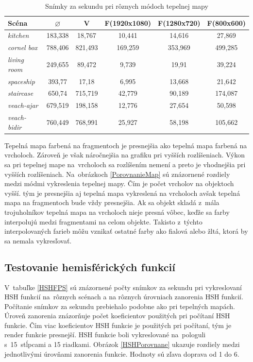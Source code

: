 \begin{table}[t!] \label{HMFPS}
\centering
\begin{tabular}{|l|c|c|c|c|c|}
\hline
\textbf{Scéna} & $\varnothing$ & \textbf{V} & \textbf{F(1920x1080)} & \textbf{F(1280x720)} & \textbf{F(800x600)}   \\ \hline
\textit{kitchen} & 183,338 & 18,767 & 10,441 & 14,616 & 27,869 \\ \hline
\textit{cornel box} & 788,406 & 821,493 & 169,259 & 353,969 & 499,285 \\ \hline
\textit{living room} & 249,655 & 89,472 & 9,739 & 19,91 & 39,224 \\ \hline
\textit{spaceship} & 393,77 & 17,18 & 6,995 & 13,668 & 21,642 \\ \hline
\textit{staircase} & 650,74 & 715,719 & 42,779 & 90,189 & 174,087 \\ \hline
\textit{veach-ajar} & 679,519 & 198,158 & 12,776 & 27,654 & 50,598 \\ \hline
\textit{veach-bidir} & 760,449 & 768,991 & 25,927 & 58,198 & 105,662 \\ \hline
\end{tabular}
\caption{Snímky za sekundu pri rôznych módoch tepelnej mapy}
\end{table}

\noindent Tepelná mapa farbená na fragmentoch je presnejšia ako tepelná mapa farbená na vrcholoch. Zároveň je však náročnejšia na grafiku pri vyšších rozlíšeniach. Výkon sa pri tepelnej mape na~vrcholoch sa rozlíšením nemení a preto je vhodnejšia pri vyšších rozlíšeniach. Na~obrázkoch \ref{PorovnanieMap} sú znázornené rozdiely medzi módmi vykreslenia tepelnej mapy. Čím je počet vrcholov na objektoch vyšší. tým je presnejšia aj tepelná mapa vykreslená na vrcholoch avšak tepelná mapa na fragmentoch bude vždy presnejšia. Ak sa objekt skladá z~mála trojuholníkov tepelná mapa na vrcholoch nieje presná vôbec, keďže sa farby interpolujú medzi fragmentami na celom objekte. Takisto z~týchto interpolovaných farieb môžu vznikať ostatné farby ako fialová alebo žltá, ktorá by sa nemala vykresľovať. 
\subsection*{Testovanie hemisférických funkcií}
V~tabuľke \ref{HSHFPS} sú znázornené počty snímkov za sekundu pri vykreslovaní HSH funkcií na~rôznych scénach a na rôznych úrovniach zanorenia HSH funkcií. Počítanie snímkov za sekundu prebiehalo podobne ako pri tepelných mapách. Úroveň zanorenia znázorňuje počet koeficientov použitých pri počítaní HSH funkcie. Čím viac koeficientov HSH funkcie je použitých pri počítaní, tým je render funkcie presnejší. HSH funkcie boli vykreslované na~pologuli s~15~stĺpcami a 15 riadkami. Obrázok \ref{HSHPorovnane} ukazuje rozdiely medzi jednotlivými úrovňami zanorenia funkcie. Hodnoty sú zľava doprava od 1 do 6.

